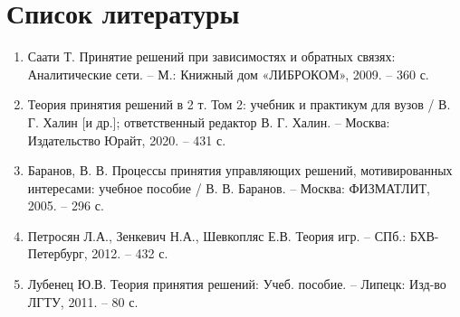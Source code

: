 \clearpage

\section{Список литературы}

\begin{enumerate}
    \item Саати Т. Принятие решений при зависимостях и обратных связях: Аналитические сети. -- М.: Книжный дом «ЛИБРОКОМ», 2009. -- 360 с.
    \item Теория принятия решений в 2 т. Том 2: учебник и практикум для вузов / В. Г. Халин [и др.]; ответственный редактор В. Г. Халин. -- Москва: Издательство Юрайт, 2020. -- 431 с.
    \item Баранов, В. В. Процессы принятия управляющих решений, мотивированных интересами: учебное пособие / В. В. Баранов. -- Москва: ФИЗМАТЛИТ, 2005. -- 296 с.
    \item Петросян Л.А., Зенкевич Н.А., Шевкопляс Е.В. Теория игр. -- СПб.: БХВ-Петербург, 2012. -- 432 с.
    \item Лубенец Ю.В. Теория принятия решений: Учеб. пособие. -- Липецк: Изд-во ЛГТУ, 2011. -- 80 с.
\end{enumerate}
